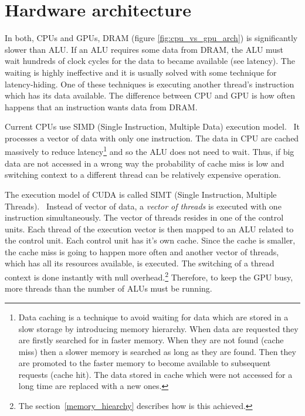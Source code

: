 \documentclass[12pt,oneside]{fithesis2}
\begin{document}
\section{Hardware architecture}
\label{cuda_architecture}

In both, CPUs and GPUs, DRAM (figure \ref{fig:cpu_vs_gpu_arch}) is significantly slower than ALU. If an ALU requires some data from DRAM, the ALU must wait hundreds of clock cycles for the data to became available (see latency). The waiting is highly ineffective and it is usually solved with some technique for latency-hiding. One of these techniques is executing another thread's instruction which has its data available. The difference between CPU and GPU is how often happens that an instruction wants data from DRAM.

Current CPUs use SIMD (Single Instruction, Multiple Data) execution model.~\cite{professional_cuda} It processes a vector of data with only one instruction. The data in CPU are cached massively to reduce latency\footnote{Data caching is a technique to avoid waiting for data which are stored in a slow storage by introducing memory hierarchy. When data are requested they are firstly searched for in faster memory. When they are not found (cache miss) then a slower memory is searched as long as they are found. Then they are promoted to the faster memory to become available to subsequent requests (cache hit). The data stored in cache which were not accessed for a long time are replaced with a new ones.} and so the ALU does not need to wait. Thus, if big data are not accessed in a wrong way the probability of cache miss is low and switching context to a different thread can be relatively expensive operation.

The execution model of CUDA is called SIMT (Single Instruction, Multiple Threads).~\cite{professional_cuda} Instead of vector of data, a \emph{vector of threads} is executed with one instruction simultaneously. The vector of threads resides in one of the control units. Each thread of the execution vector is then mapped to an ALU related to the control unit. Each control unit has it's own cache. Since the cache is smaller, the cache miss is going to happen more often and another vector of threads, which has all its resources available, is executed. The switching of a thread context is done instantly with null overhead.\footnote{The section~\ref{memory_hiearchy} describes how is this achieved.} Therefore, to keep the GPU busy, more threads than the number of ALUs must be running.
\end{document}
